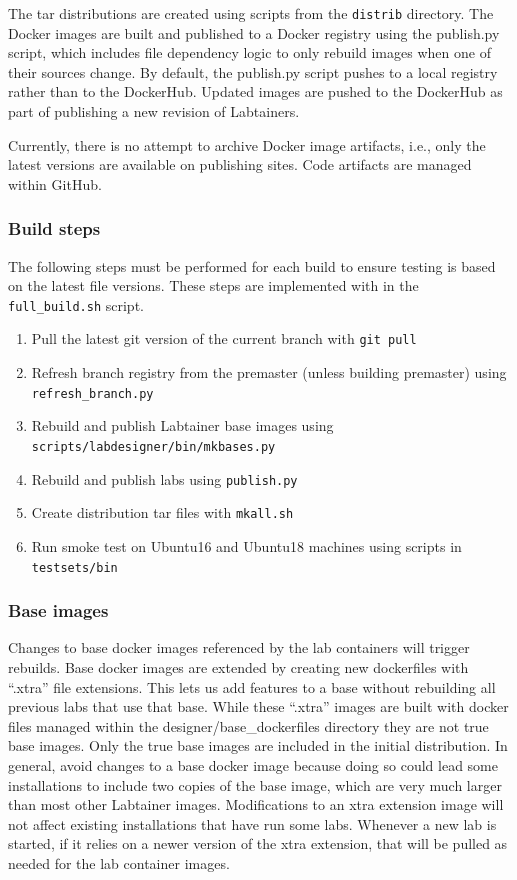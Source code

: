 \documentclass[12pt]{article}
\begin{document}
The tar distributions are created using scripts from the {\tt distrib} directory.  The Docker images are built and published to
a Docker registry using the publish.py script, which includes file dependency logic to only rebuild images when one
of their sources change.  By default, the publish.py script pushes to a local registry rather than to the DockerHub.  
Updated images are pushed to the DockerHub as part of publishing a new revision of Labtainers.

Currently, there is no attempt to archive Docker image artifacts, i.e., only the latest versions are available on publishing sites.
Code artifacts are managed within GitHub.

\subsubsection{Build steps}
The following steps must be performed for each build to ensure testing is based on the latest file versions.
These steps are implemented with in the {\tt full\_build.sh} script.
\begin{enumerate}
\item Pull the latest git version of the current branch with {\tt git pull}
\item Refresh branch registry from the premaster (unless building premaster) using {\tt refresh\_branch.py}
\item Rebuild and publish Labtainer base images using {\tt scripts/labdesigner/bin/mkbases.py}
\item Rebuild and publish labs using {\tt publish.py}
\item Create distribution tar files with {\tt mkall.sh}
\item Run smoke test on Ubuntu16 and Ubuntu18 machines using scripts in {\tt testsets/bin}
\end{enumerate}

\subsubsection{Base images}
Changes to base docker images referenced by the lab containers will trigger rebuilds.  Base docker images are extended by creating
new dockerfiles with ``.xtra'' file extensions.  
This lets us add features to a base without rebuilding all previous labs that use that base.  
While these ``.xtra'' images are built with docker files managed within the
designer/base\_dockerfiles directory they are not true base images.
Only the true base images are included in the initial distribution.  
In general, avoid changes to a base docker image because doing so could lead some installations
to include two copies of the base image, which are very much larger than most other Labtainer images.  
Modifications to an xtra extension image will not affect existing installations that have run
some labs.  Whenever a new lab is started, if it relies on a newer version of the xtra extension, that will be pulled as needed for the 
lab container images.
\end{document}
